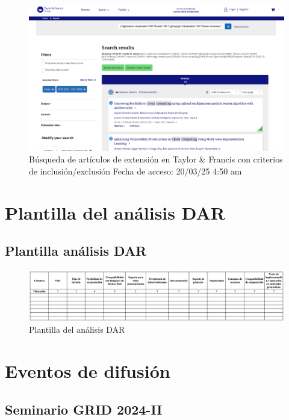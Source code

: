 \FloatBarrier\begin{figure}[H]
    \centering
    \includegraphics[width=\textwidth,keepaspectratio]{apendices/BD/criterios/TF-ind.png}
    \caption{Búsqueda de artículos de extensión en Taylor \& Francis con criterios de inclusión/exclusión
    Fecha de acceso: 20/03/25 4:50 am
    }
\end{figure}
\FloatBarrier\chapter{Plantilla del análisis DAR}

\section{Plantilla análisis DAR}

\begin{figure}[H]
    \centering
    \includegraphics[width=\textwidth,height=0.85\textheight,keepaspectratio]{apendices/plantilla-DAR.png}
    \caption{Plantilla del análisis DAR}\label{fig:tabla-plantilla-dar}
\end{figure}
\FloatBarrier\chapter{Eventos de difusión}
\section{Seminario GRID 2024-II}


